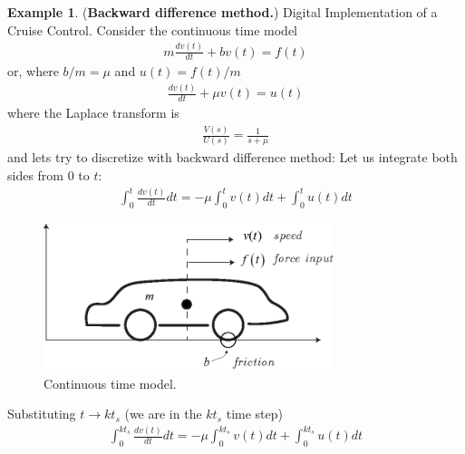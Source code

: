 \documentclass[11pt,a4paper,oneside]{book}
\numberwithin{equation}{section}
\theoremstyle{it}
\theoremstyle{definition}
\newtheorem{example}{Example}[chapter]
\begin{document}
\begin{example}(\textbf{Backward difference method.}) Digital Implementation of 
a Cruise Control. Consider the continuous time model
\begin{equation}\label{mainref}
	\begin{split}
		m\frac{dv(t)}{dt} + b v(t) = f(t)
	\end{split}
\end{equation}
or, where $b/m=\mu$ and $u(t)=f(t)/m$
\begin{equation}\label{mainref}
	\begin{split}
		\frac{dv(t)}{dt} + \mu v(t) = u(t)
	\end{split}
\end{equation}
where the Laplace transform is 
\begin{equation}\label{laplace_ref}
	\begin{split}
		\frac{V(s)}{U(s)} = \frac{1}{s+\mu}
	\end{split}
\end{equation}
and lets try to discretize with backward difference method:
Let us integrate both sides from $0$ to $t$:
\begin{equation}
	\begin{split}
		\int_{0}^{t}\frac{dv(t)}{dt} dt = - \mu \int_{0}^{t} v(t) dt + \int_{0}^{t} u(t) dt
	\end{split}
\end{equation}
\begin{figure}[H]
	\centering
	\includegraphics[width = 240pt, keepaspectratio]{figures/discretization/speed_model.eps}
			\captionsetup{width=0.5\textwidth, font=small}		
			\caption{Continuous time model.}
	\label{figure_model_speed}
\end{figure}
Substituting $t \rightarrow kt_s$ (we are in the $kt_s$ time step)
\begin{equation}
	\begin{split}
		\int_{0}^{kt_s}\frac{dv(t)}{dt} dt = - \mu \int_{0}^{kt_s} v(t) dt + \int_{0}^{kt_s} u(t) dt
	\end{split}
\end{equation}

\end{example}
\end{document}
